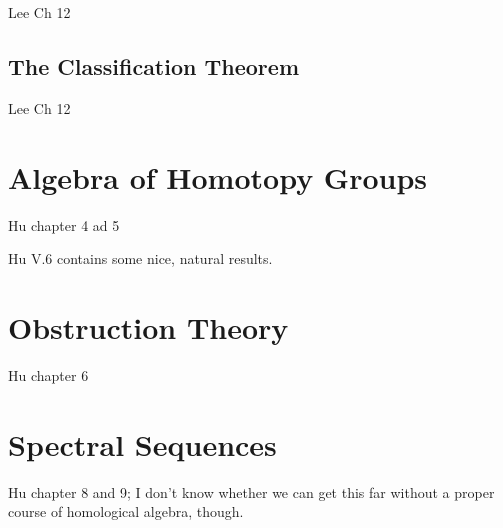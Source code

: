 \documentclass[oneside,english]{amsbook}
\numberwithin{section}{chapter}
\theoremstyle{plain}
\theoremstyle{definition}
\begin{document}
	Lee Ch 12

	\section{The Classification Theorem}
	
	Lee Ch 12

	\chapter{Algebra of Homotopy Groups}	

	Hu chapter 4 ad 5
	
	Hu V.6 contains some nice, natural results.

	\chapter{Obstruction Theory}	

	Hu chapter 6

	\chapter{Spectral Sequences}	

	Hu chapter 8 and 9; I don't know whether we can get this far without a proper course of homological algebra, though.
\end{document}
